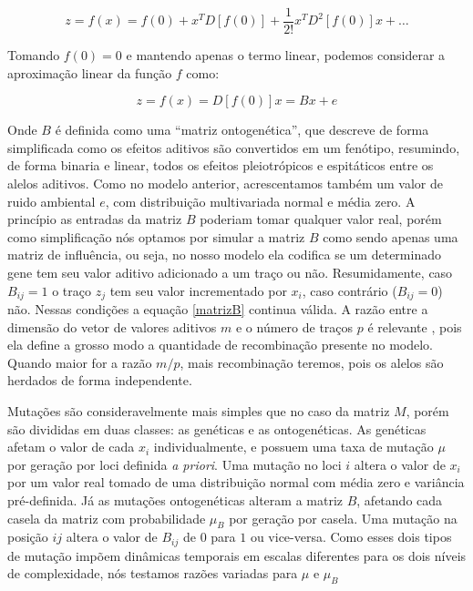 \begin{equation}
z = f(x) = f(0) + x^T D[f(0)] + \frac{1}{2!} x^T D^2 [f(0)] x + \ldots
\end{equation}

Tomando $f(0) = 0$ e mantendo apenas o termo linear, podemos considerar
a aproximação linear da função $f$ como:

\begin{equation}
z = f(x) = D[f(0)]x = Bx + e
\label{matrizB}
\end{equation}

Onde $B$ é definida como uma ``matriz ontogenética'', que descreve de
forma simplificada como os efeitos aditivos são convertidos em um
fenótipo, resumindo, de forma binaria e linear, todos os efeitos
pleiotrópicos e espitáticos entre os alelos aditivos.
Como no modelo anterior, acrescentamos também um valor de ruido
ambiental $e$, com distribuição multivariada normal e média zero.
A princípio as entradas da matriz $B$ poderiam tomar qualquer valor
real, porém como simplificação nós optamos por simular a matriz $B$ como
sendo apenas uma matriz de influência, ou seja, no nosso modelo ela
codifica se um determinado gene tem seu valor aditivo adicionado a um
traço ou não.
Resumidamente, caso $B_{ij} = 1$ o traço $z_j$ tem seu valor
incrementado por $x_i$, caso contrário ($B_{ij} = 0$) não.
Nessas condições a equação \ref{matrizB} continua válida.
A razão entre a dimensão do vetor de valores aditivos $m$ e o número de
traços $p$ é relevante \citep{Wagner1984}, pois ela define a grosso modo
a quantidade de recombinação presente no modelo.
Quando maior for a razão $m/p$, mais
recombinação teremos, pois os alelos são herdados de forma independente.

Mutações são consideravelmente mais simples que no caso da
matriz $M$, porém são divididas em duas classes: as genéticas e as
ontogenéticas.
As genéticas afetam o valor de cada $x_i$ individualmente, e possuem uma
taxa de mutação $\mu$ por geração por loci definida {\it a priori}.
Uma mutação no loci $i$ altera o valor de $x_i$ por um valor real tomado
de uma distribuição normal com média zero e variância pré-definida.
Já as mutações ontogenéticas alteram a matriz $B$, afetando cada casela
da matriz com probabilidade $\mu_B$ por geração por casela.
Uma mutação na posição $ij$ altera o valor de $B_{ij}$ de $0$ para $1$
ou vice-versa.
Como esses dois tipos de mutação impõem dinâmicas temporais em escalas
diferentes para os dois níveis de complexidade, nós testamos razões
variadas para $\mu$ e $\mu_B$

